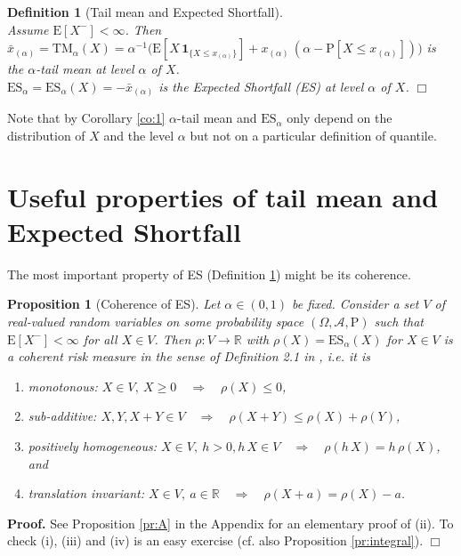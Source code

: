 \documentclass[11pt,a4paper,leqno]{article}
\newtheorem{proposition}[theorem]{Proposition}
\newtheorem{definition}[theorem]{Definition}
\begin{document}
\begin{definition}[Tail mean and Expected Shortfall]
\label{def:6}\ \\
Assume $\mathrm{E}[X^-] < \infty$. Then\\
$\bar{x}_{(\alpha)} = \mathrm{TM}_\alpha(X) =  \alpha^{-1} \big( \mathrm{E}[ X \,\mathbf{1}_{\{X \le x_{(\alpha)}\}}]
+ x_{(\alpha)}\,(\alpha - \mathrm{P}[X \le x_{(\alpha)}])\Big)$ is the \emph{$\alpha$-tail mean} at level $\alpha$ of
$X$.\\
$\mathrm{ES}_\alpha = \mathrm{ES}_\alpha(X) = -\bar{x}_{(\alpha)}$ is the \emph{Expected Shortfall (ES)} at level $\alpha$ of
$X$. \hfill $\Box$
\end{definition}
%
Note that by Corollary \ref{co:1}  $\alpha$-tail mean  and $\mathrm{ES}_\alpha$ only depend on the distribution of $X$ and the level
$\alpha$ but not on a particular definition of quantile.


\section{Useful properties of tail mean and Expected Shortfall}
\label{sec:properties}
\setcounter{equation}{0}

The most important property of ES (Definition \ref{def:6}) might be its coherence. 


\begin{proposition}[Coherence of ES]
\label{pr:coh}
Let $\alpha \in (0,1)$ be fixed. Consider a set $V$ of 
real-valued random variables on some probability space $(\Omega, \mathcal{A}, \mathrm{P})$
such that $\mathrm{E}[X^-] < \infty$ for all $X \in V$. Then $\rho: V \to \mathbb{R}$ with
$\rho(X) = \mathrm{ES}_\alpha(X)$ for $X\in V$
is a coherent risk measure in the sense of Definition 2.1 in \cite{Delb98}, i.e. it is
\begin{enumerate}
\item monotonous: $X \in V,\ X \ge 0 \quad \Rightarrow \quad \rho(X) \le 0$,
%
\item sub-additive: $X, Y, X+Y \in V\quad \Rightarrow \quad \rho(X+Y) \le
\rho(X) + \rho(Y)$,
%
\item positively homogeneous: $X \in V,\ h > 0, h\,X\in V \quad \Rightarrow \quad \rho(h\,X)
= h\,\rho(X)$, and
%
\item translation invariant: $X \in V, \ a \in \mathbb{R} \quad \Rightarrow \quad \rho(X + a) =
\rho(X) - a$.
\end{enumerate}  
\end{proposition}
%
\textbf{Proof.} See Proposition \ref{pr:A} in the Appendix for an elementary proof of (ii). To check (i),
(iii) and (iv) is an easy exercise (cf. also Proposition \ref{pr:integral}). \hfill $\Box$
\end{document}
